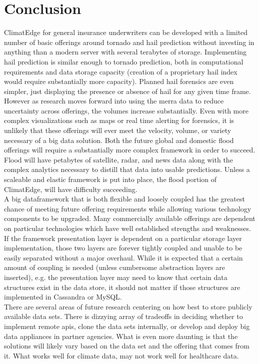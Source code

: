 \section{Conclusion}
ClimatEdge\texttrademark{} for general insurance underwriters can be developed with a limited number of basic offerings around tornado and hail prediction without investing in anything than a modern server with several terabytes of storage. Implementing hail prediction is similar enough to tornado prediction, both in computational requirements and data storage capacity (creation of a proprietary hail index would require substantially more capacity). Planned hail forensics are even simpler, just displaying the presence or absence of hail for any given time frame. However as research moves forward into using the \gls{merra} data to reduce uncertainty across offerings, the volumes increase substantially. Even with more complex visualizations such as maps or real time alerting for forensics, it is unlikely that these offerings will ever meet the velocity, volume, or variety necessary of a big data solution. Both the future global and domestic flood offerings will require a substantially more complex framework in order to succeed. Flood will have petabytes of satellite, radar, and news data along with the complex analytics necessary to distill that data into usable predictions. Unless a scaleable and elastic framework is put into place, the flood portion of ClimatEdge\texttrademark{}, will have difficulty succeeding.\\

A big dataframework that is both flexible and loosely coupled has the greatest chance of meeting future offering requirements while allowing various technology components to be upgraded. Many commercially available offerings are dependent on particular technologies which have well established strengths and weaknesses. If the framework presentation layer is dependent on a particular storage layer implementation, those two layers are forever tightly coupled and unable to be easily separated without a major overhaul. While it is expected that a certain amount of coupling is needed (unless cumbersome abstraction layers are inserted), e.g. the presentation layer may need to know that certain data structures exist in the data store, it should not matter if those structures are implemented in Cassandra or MySQL.\\

There are several areas of future research centering on how best to store publicly available data sets. There is dizzying array of tradeoffs in deciding whether to implement remote \gls{api}s, clone the data sets internally, or develop and deploy big data appliances in partner agencies. What is even more daunting is that the solutions will likely vary based on the data set and the offering that comes from it. What works well for climate data, may not work well for healthcare data.\\